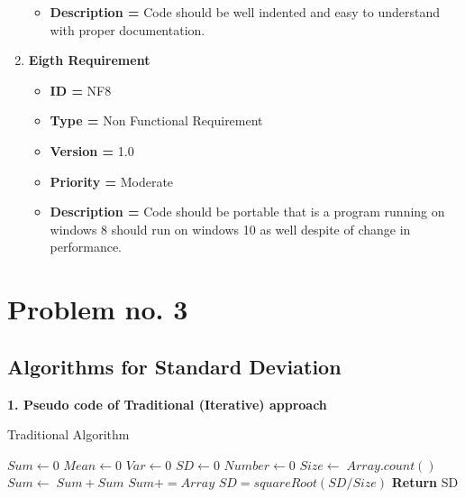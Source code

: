 \documentclass[12pt,a4paper]{report}
\begin{document}
\begin{enumerate}[noitemsep]
\begin{itemize}[noitemsep]
            \item\textbf{Description = }   Code should be well indented and easy to understand with proper documentation. 
        \end{itemize}
        \item \textbf{Eigth Requirement}
        \begin{itemize}[noitemsep]
            \item \textbf{ID = } NF8
            \item\textbf{Type = } Non Functional Requirement
            \item\textbf{Version = } 1.0
            \item\textbf{Priority = } Moderate
            \item\textbf{Description = }   Code should be portable that is a program running on windows 8 should run on windows 10 as well despite of change in performance. 
        \end{itemize}
        \newpage
    \end{enumerate}

\chapter{Problem no. 3}
\section*{Algorithms for Standard Deviation}
\textbf{1. Pseudo code of Traditional (Iterative) approach}\\

\begin{algorithm}
\caption{Traditional Algorithm}

\begin{algorithmic}[1]

    \State $Sum \leftarrow 0$
    \State $Mean \leftarrow 0$
    \State $Var \leftarrow 0$
    \State $SD \leftarrow 0$
    \State $Number \leftarrow 0$
    \State $Size \leftarrow \;Array.count()$
    \State $Sum \leftarrow \;Sum+Sum$
    \State $Sum+=Array$
    \EndFor
    \State $SD=squareRoot(SD/Size)$
    \State \textbf{Return} SD
    \EndProcedure
\Statex
\end{algorithmic}
\end{algorithm}
\end{document}
